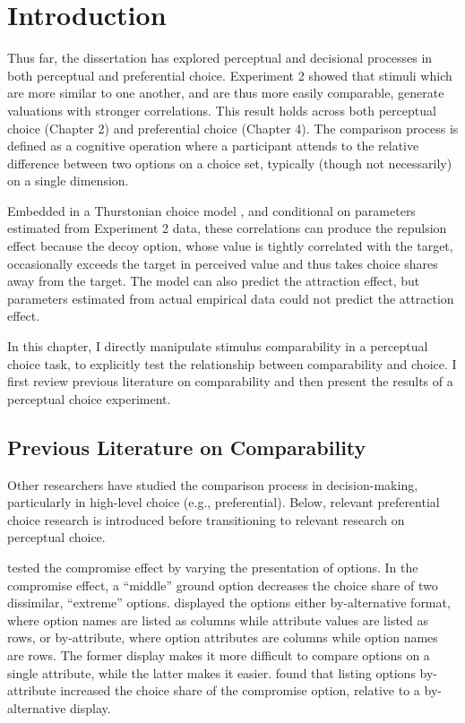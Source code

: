 \section{Introduction}

Thus far, the dissertation has explored perceptual and decisional processes in both perceptual and preferential choice. Experiment 2 showed that stimuli which are more similar to one another, and are thus more easily comparable, generate valuations with stronger correlations. This result holds across both perceptual choice (Chapter 2) and preferential choice (Chapter 4). The comparison process is defined as a cognitive operation where a participant attends to the relative difference between two options on a choice set, typically (though not necessarily) on a single dimension. 

Embedded in a Thurstonian choice model \parencite{thurstone1927law}, and conditional on parameters estimated from Experiment 2 data, these correlations can produce the repulsion effect \parencite{spektorWhenGoodLooks2018b,simonson2014vices} because the decoy option, whose value is tightly correlated with the target, occasionally exceeds the target in perceived value and thus takes choice shares away from the target. The model can also predict the attraction effect, but parameters estimated from actual empirical data could not predict the attraction effect.

In this chapter, I directly manipulate stimulus comparability in a perceptual choice task, to explicitly test the relationship between comparability and choice. I first review previous literature on comparability and then present the results of a perceptual choice experiment.

\subsection{Previous Literature on Comparability}

Other researchers have studied the comparison process in decision-making, particularly in high-level choice (e.g., preferential). Below, relevant preferential choice research is introduced before transitioning to relevant research on perceptual choice. 

\textcite{changWhichCompromiseOption2008} tested the compromise effect by varying the presentation of options. In the compromise effect, a “middle” ground option decreases the choice share of two dissimilar, “extreme” options. \textcite{changWhichCompromiseOption2008} displayed the options either by-alternative format, where option names are listed as columns while attribute values are listed as rows, or by-attribute, where option attributes are columns while option names are rows. The former display makes it more difficult to compare options on a single attribute, while the latter makes it easier. \textcite{changWhichCompromiseOption2008} found that listing options by-attribute increased the choice share of the compromise option, relative to a by-alternative display. 

